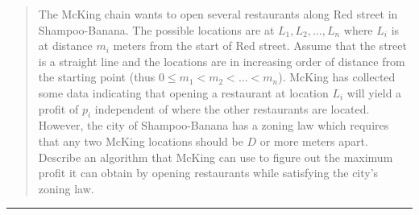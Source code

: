 \documentclass[11pt]{article}
\begin{document}



\begin{quote}

\begin{enumerate}
	The McKing chain wants to open several restaurants along Red street
	in Shampoo-Banana. The possible locations are at $L_1,L_2, \ldots,
	L_n$ where $L_i$ is at distance $m_i$ meters from the start of Red
	street. Assume that the street is a straight line and the locations
	are in increasing order of distance from the starting point (thus $0
	\leq m_1 < m_2 < \ldots < m_n$). McKing has collected some data
	indicating that opening a restaurant at location $L_i$ will yield a
	profit of $p_i$ independent of where the other restaurants are
	located. However, the city of Shampoo-Banana has a zoning law which
	requires that any two McKing locations should be $D$ or more meters
	apart. Describe an algorithm that McKing can use to figure out the
	maximum profit it can obtain by opening restaurants while
	satisfying the city's zoning law.
\end{enumerate}

\end{quote}
\hrule
\end{document}
